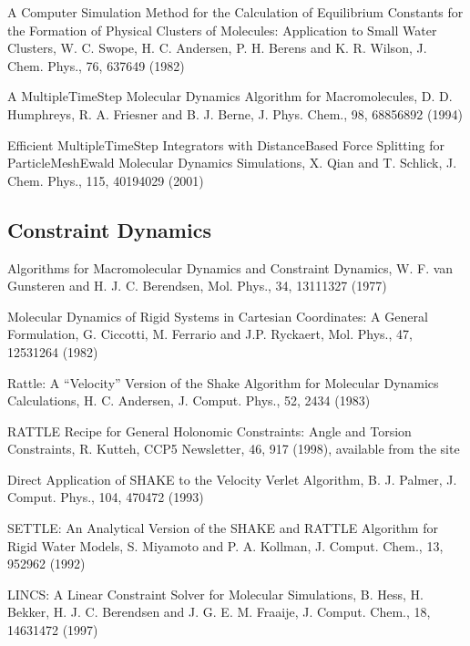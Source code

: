 \documentclass[letterpaper,11pt,english]{sphinxmanual}
\begin{document}
A Computer Simulation Method for the Calculation of Equilibrium Constants for the Formation of Physical Clusters of Molecules: Application to Small Water Clusters, W. C. Swope, H. C. Andersen, P. H. Berens and K. R. Wilson, J. Chem. Phys., 76, 637\sphinxhyphen{}649 (1982)

A Multiple\sphinxhyphen{}Time\sphinxhyphen{}Step Molecular Dynamics Algorithm for Macromolecules, D. D. Humphreys, R. A. Friesner and B. J. Berne, J. Phys. Chem., 98, 6885\sphinxhyphen{}6892 (1994)

Efficient Multiple\sphinxhyphen{}Time\sphinxhyphen{}Step Integrators with Distance\sphinxhyphen{}Based Force Splitting for Particle\sphinxhyphen{}Mesh\sphinxhyphen{}Ewald Molecular Dynamics Simulations, X. Qian and T. Schlick, J. Chem. Phys., 115, 4019\sphinxhyphen{}4029 (2001)


\subsection{Constraint Dynamics}
\label{\detokenize{text/references:constraint-dynamics}}
Algorithms for Macromolecular Dynamics and Constraint Dynamics, W. F. van Gunsteren and H. J. C. Berendsen, Mol. Phys., 34, 1311\sphinxhyphen{}1327 (1977)

Molecular Dynamics of Rigid Systems in Cartesian Coordinates: A General Formulation, G. Ciccotti, M. Ferrario and J.\sphinxhyphen{}P. Ryckaert, Mol. Phys., 47, 1253\sphinxhyphen{}1264 (1982)

Rattle: A “Velocity” Version of the Shake Algorithm for Molecular Dynamics Calculations, H. C. Andersen, J. Comput. Phys., 52, 24\sphinxhyphen{}34 (1983)

RATTLE Recipe for General Holonomic Constraints: Angle and Torsion Constraints, R. Kutteh, CCP5 Newsletter, 46, 9\sphinxhyphen{}17 (1998), available from the site 

Direct Application of SHAKE to the Velocity Verlet Algorithm, B. J. Palmer, J. Comput. Phys., 104, 470\sphinxhyphen{}472 (1993)

SETTLE: An Analytical Version of the SHAKE and RATTLE Algorithm for Rigid Water Models, S. Miyamoto and P. A. Kollman, J. Comput. Chem., 13, 952\sphinxhyphen{}962 (1992)

LINCS: A Linear Constraint Solver for Molecular Simulations, B. Hess, H. Bekker, H. J. C. Berendsen and J. G. E. M. Fraaije, J. Comput. Chem., 18, 1463\sphinxhyphen{}1472 (1997)
\end{document}
